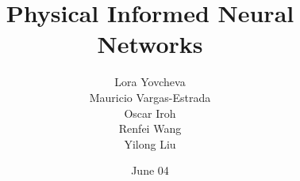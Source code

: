 \documentclass{beamer}
\title{Physical Informed Neural Networks}
\date{June 04}
\author{Lora Yovcheva\\
Mauricio Vargas-Estrada\\
Oscar Iroh\\
Renfei Wang\\
Yilong Liu}
\begin{document}
\insertTitleSlide








\insertLastSlide
\end{document}
